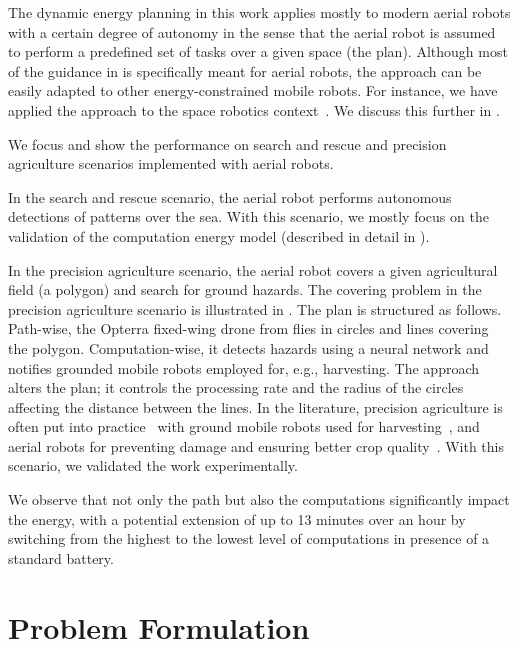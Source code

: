 The dynamic energy planning in this work applies mostly to modern aerial robots with a certain degree of autonomy in the sense that the aerial robot is assumed to perform a predefined set of tasks over a given space (the plan). Although most of the guidance in  is specifically meant for aerial robots, the approach can be easily adapted to other energy-constrained mobile robots. For instance, we have applied the approach to the space robotics context~\citep{seewald2020beyond}. We discuss this further in .

We focus and show the performance on search and rescue and precision agriculture scenarios implemented with aerial robots. 

In the search and rescue scenario, the aerial robot performs autonomous detections of patterns over the sea. With this scenario, we mostly focus on the validation of the computation energy model (described in detail in ).

In the precision agriculture scenario, the aerial robot covers a given agricultural field (a polygon) and search for ground hazards. The covering problem in the precision agriculture scenario is illustrated in . The plan is structured as follows. Path-wise, the Opterra fixed-wing drone from  flies in circles and lines covering the polygon. Computation-wise, it detects hazards using a neural network and notifies grounded mobile robots employed for, e.g., harvesting. The approach alters the plan; it controls the processing rate and the radius of the circles affecting the distance between the lines. In the literature, precision agriculture is often put into practice~\citep{hajjaj2014review} with ground mobile robots used for harvesting~\citep{qingchun2012study,dong2011development, de2011design, aljanobi2010setup, li2008analysis, edan2000robotic}, and aerial robots for preventing damage and ensuring better crop quality~\citep{puri2017agriculture, daponte2019review}. With this scenario, we validated the work experimentally.

We observe that not only the path but also the computations significantly impact the energy, with a potential extension of up to 13 minutes over an hour by switching from the highest to the lowest level of computations in presence of a standard battery.


\section{Problem Formulation}
\label{sec:pb-form}

